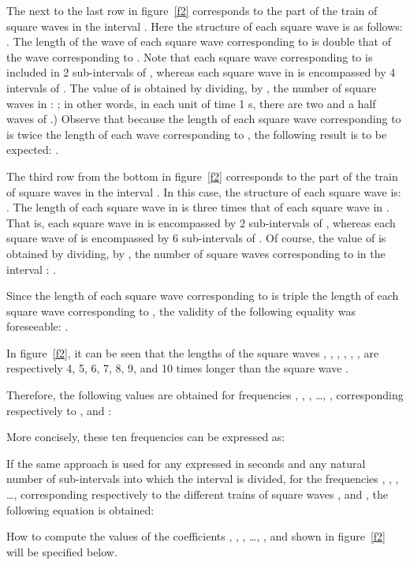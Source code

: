 \documentclass[11pt]{rMTA2010} \usepackage[utf8]{inputenc} \usepackage{graphicx} \usepackage{booktabs} \usepackage{array} \usepackage{enumerate}
\begin{document}
The next to the last row in figure~\ref{f2} corresponds to the part of the train of square waves  in the interval . Here the structure of each square wave is as follows: . The length of the wave of each square wave corresponding to  is double that of the wave corresponding to . Note that each square wave corresponding to  is included in 2 sub-intervals of , whereas each square wave in  is encompassed by 4 intervals of . The value of  is obtained by dividing, by , the number of square waves  in : ; in other words, in each unit of time 1 s, there are two and a half waves of .) Observe that because the length of each square wave corresponding to  is twice the length of each wave corresponding to , the following result is to be expected: .


The third row from the bottom in figure~\ref{f2} corresponds to the part of the train of square waves  in the interval . In this case, the structure of each square wave is: . The length of each square wave in  is three times that of each square wave in . That is, each square wave in  is encompassed by 2 sub-intervals of , whereas each square wave of  is encompassed by 6 sub-intervals of . Of course, the value of  is obtained by dividing, by , the number of square waves corresponding to  in the interval : .

Since the length of each square wave corresponding to  is triple the length of each square wave corresponding to , the validity of the following equality was foreseeable: .

In figure~\ref{f2}, it can be seen that the lengths of the square waves , , , , , ,  are respectively 4, 5, 6, 7, 8, 9, and 10 times longer than the square wave .

Therefore, the following values are obtained for frequencies , , , \ldots, , corresponding respectively to , and :



More concisely, these ten frequencies can be expressed as:


If the same approach is used for any  expressed in seconds and any natural number  of sub-intervals into which
the interval  is divided, for the frequencies , , , \ldots,  corresponding respectively to the different trains of square waves , and , the following equation is obtained:


How to compute the values of the coefficients , , , \ldots, , and  shown in figure~\ref{f2} will be specified below.
\end{document}
